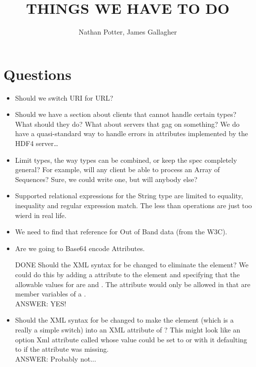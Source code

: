 \documentclass[justify]{dods-paper}
\title{THINGS WE HAVE TO DO}
\author{Nathan Potter, James Gallagher}
\begin{document}
\maketitle

\section{Questions}
\begin{itemize}
\item Should we switch URI for URL?

\item Should we have a section about clients that cannot handle certain
  types? What should they do? What about servers that gag on something? We do
  have a quasi-standard way to handle errors in attributes implemented by the
  HDF4 server\ldots
  
\item Limit types, the way types can be combined, or keep the spec completely
  general? For example, will any client be able to process an Array of
  Sequences? Sure, we could write one, but will anybody else?
  
\item Supported relational expressions for the String type are limited to
  equality, inequality and regular expression match. The less than operations
  are just too wierd in real life.
  
\item We need to find that reference for Out of Band data (from the W3C).

\item Are we going to Base64 encode Attributes.

\item [DONE] Should the XML syntax for \Grid be changed to eliminate
the \Target element? We could do this by adding a  attribute
to the \Alias element and specifying that the allowable values for
 are  and . The  attribute
would only be allowed in \Aliases that are member variables of a
\Grid.\\ ANSWER: YES!

\item Should the XML syntax for \Constraint be changed to make the
\NoAttributes element (which is a really a simple switch) into an XML
attribute of \Constraint?  This might look like an option Xml
attribute called  whose value could be set to
 or  with it defaulting to  if the attribute
was missing.\\ANSWER: Probably not...


\end{itemize}
\end{document}
